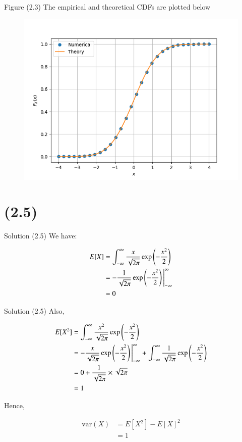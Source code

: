 \documentclass{beamer}
\providecommand{\brak}[1]{\ensuremath{\left(#1\right)}}
\begin{document}
\begin{frame}{Figure (2.3)}
    The empirical and theoretical CDFs are plotted below
	\begin{figure}
		\centerline{\includegraphics[width=\textheight]{./figures/CDF_gau.png}}
		\label{fig3}
	\end{figure}	
\end{frame}

\section{(2.5)}
\begin{frame}{Solution (2.5)}
    We have:
    
    \begin{align}
        E[X] &=  \int_{-\infty}^{\infty} \frac{x}{\sqrt{2\pi}}\exp{\left(-\frac{x^2}{2}\right)} \\
        &= -\frac{1}{\sqrt{2\pi}}\exp\brak{-\frac{x^2}{2}} \Bigg{|}_{-\infty}^{\infty} \\
        &= 0 
    \end{align}
    
    \end{frame}
    
    \begin{frame}{Solution (2.5)}
    Also,
    
    \begin{align}
        E[X^2] &=  \int_{-\infty}^{\infty} \frac{x^2}{\sqrt{2\pi}}\exp{\left(-\frac{x^2}{2}\right)} \\
        &= -\frac{x}{\sqrt{2\pi}}\exp\brak{-\frac{x^2}{2}} \Bigg{|}_{-\infty}^{\infty} + \int_{-\infty}^{\infty} \frac{1}{\sqrt{2\pi}}\exp\brak{-\frac{x^2}{2}}   \\
        &= 0 + \frac{1}{\sqrt{2\pi}} \times \sqrt{2\pi} \\
        &= 1
    \end{align}
    
    Hence, 
    
    \begin{align}
        \text{var}(X) &= E[X^2] - E[X]^2 \\ 
        &= 1 
    \end{align}

\end{frame}
\end{document}
